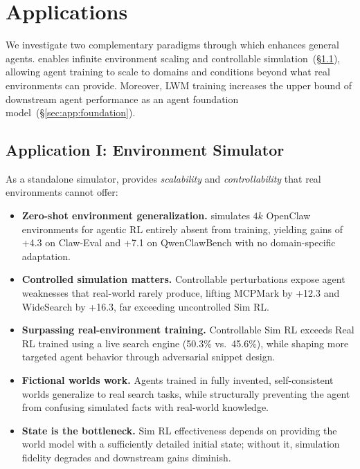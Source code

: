 \section{Applications}
\label{sec:applications}

We investigate two complementary paradigms through which \method enhances general agents.
\method enables infinite environment scaling and controllable simulation~(\S\ref{sec:app:simulator}), allowing agent training to scale to domains and conditions beyond what real environments can provide.
Moreover, LWM training increases the upper bound of downstream agent performance as an agent foundation model~(\S\ref{sec:app:foundation}).

\subsection{Application I: Environment Simulator}
\label{sec:app:simulator}

\begin{tcolorbox}[takeawaysbox]
\small
As a standalone simulator, \method provides \emph{\textcolor{colorscale}{scalability}} and \emph{\textcolor{colorctrl}{controllability}} that real environments cannot offer:
\begin{itemize}[leftmargin=1.2em,itemsep=1pt,topsep=2pt]
\item \textbf{Zero-shot environment generalization.} \method simulates $4k$ OpenClaw environments for agentic RL entirely absent from training, yielding gains of +4.3 on Claw-Eval and +7.1 on QwenClawBench with no domain-specific adaptation.
\item \textbf{Controlled simulation matters.} Controllable perturbations expose agent weaknesses that real-world rarely produce, lifting MCPMark by +12.3 and WideSearch by +16.3, far exceeding uncontrolled Sim RL.
\item \textbf{Surpassing real-environment training.} Controllable Sim RL exceeds Real RL trained using a live search engine (50.3\% vs.\ 45.6\%), while shaping more targeted agent behavior through adversarial snippet design.
\item \textbf{Fictional worlds work.} Agents trained in fully invented, self-consistent worlds generalize to real search tasks, while structurally preventing the agent from confusing simulated facts with real-world knowledge.
\item \textbf{State is the bottleneck.} Sim RL effectiveness depends on providing the world model with a sufficiently detailed initial state; without it, simulation fidelity degrades and downstream gains diminish.
\end{itemize}
\end{tcolorbox}

